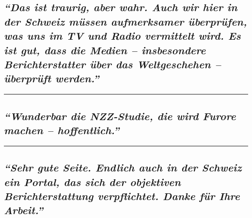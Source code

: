 \hypertarget{das-ist-traurig-aber-wahr-auch-wir-hier-in-der-schweiz-muxfcssen-aufmerksamer-uxfcberpruxfcfen-was-uns-im-tv-und-radio-vermittelt-wird-es-ist-gut-dass-die-medien--insbesondere-berichterstatter-uxfcber-das-weltgeschehen--uxfcberpruxfcft-werden}{%
\subsection{\texorpdfstring{\emph{``Das ist traurig, aber wahr. Auch wir
hier in der Schweiz müssen auf­merk­samer überprüfen, was uns im TV und
Radio vermittelt wird. Es ist gut, dass die Medien -- insbesondere
Bericht­er­statter über das Welt­ge­schehen -- überprüft
werden.''}}{``Das ist traurig, aber wahr. Auch wir hier in der Schweiz müssen auf­merk­samer überprüfen, was uns im TV und Radio vermittelt wird. Es ist gut, dass die Medien -- insbesondere Bericht­er­statter über das Welt­ge­schehen -- überprüft werden.''}}\label{das-ist-traurig-aber-wahr-auch-wir-hier-in-der-schweiz-muxfcssen-aufmerksamer-uxfcberpruxfcfen-was-uns-im-tv-und-radio-vermittelt-wird-es-ist-gut-dass-die-medien--insbesondere-berichterstatter-uxfcber-das-weltgeschehen--uxfcberpruxfcft-werden}}

\begin{center}\rule{0.5\linewidth}{\linethickness}\end{center}

\hypertarget{wunderbar-die-nzz-studie-die-wird-furore-machen--hoffentlich}{%
\subsection{\texorpdfstring{\emph{``Wunderbar die NZZ-Studie, die wird
Furore machen --
hoffentlich.''}}{``Wunderbar die NZZ-Studie, die wird Furore machen -- hoffentlich.''}}\label{wunderbar-die-nzz-studie-die-wird-furore-machen--hoffentlich}}

\begin{center}\rule{0.5\linewidth}{\linethickness}\end{center}

\hypertarget{sehr-gute-seite-endlich-auch-in-der-schweiz-ein-portal-das-sich-der-objektiven-berichterstattung-verpflichtet-danke-fuxfcr-ihre-arbeit}{%
\subsection{\texorpdfstring{\emph{``Sehr gute Seite. Endlich auch in der
Schweiz ein Portal, das sich der objektiven Berichterstattung
verpflichtet. Danke für Ihre
Arbeit.''}}{``Sehr gute Seite. Endlich auch in der Schweiz ein Portal, das sich der objektiven Berichterstattung verpflichtet. Danke für Ihre Arbeit.''}}\label{sehr-gute-seite-endlich-auch-in-der-schweiz-ein-portal-das-sich-der-objektiven-berichterstattung-verpflichtet-danke-fuxfcr-ihre-arbeit}}


